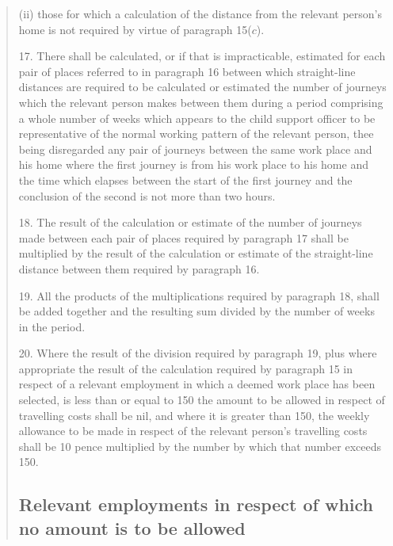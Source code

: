 \documentclass[12pt,a4paper]{article}
\begin{document}
\begin{quotation}
\begin{enumerate}
\begin{enumerate}
(ii) those for which a calculation of the distance from the relevant person’s home is not required by virtue of paragraph 15($c$).
\end{enumerate}
\end{enumerate}

\medskip

17.  There shall be calculated, or if that is impracticable, estimated for each pair of places referred to in paragraph 16 between which straight-line distances are required to be calculated or estimated the number of journeys which the relevant person makes between them during a period comprising a whole number of weeks which appears to the child support officer to be representative of the normal working pattern of the relevant person, thee being disregarded any pair of journeys between the same work place and his home where the first journey is from his work place to his home and the time which elapses between the start of the first journey and the conclusion of the second is not more than two hours.

\medskip

18.  The result of the calculation or estimate of the number of journeys made between each pair of places required by paragraph 17 shall be multiplied by the result of the calculation or estimate of the straight-line distance between them required by paragraph 16.

\medskip

19.  All the products of the multiplications required by paragraph 18, shall be added together and the resulting sum divided by the number of weeks in the period.

\medskip

20.  Where the result of the division required by paragraph 19, plus where appropriate the result of the calculation required by paragraph 15 in respect of a relevant employment in which a deemed work place has been selected, is less than or equal to 150 the amount to be allowed in respect of travelling costs shall be nil, and where it is greater than 150, the weekly allowance to be made in respect of the relevant person’s travelling costs shall be 10 pence multiplied by the number by which that number exceeds 150.

\subsection*{\sloppy Relevant employments in respect of which no amount is to be allowed}


\end{quotation}
\end{document}
